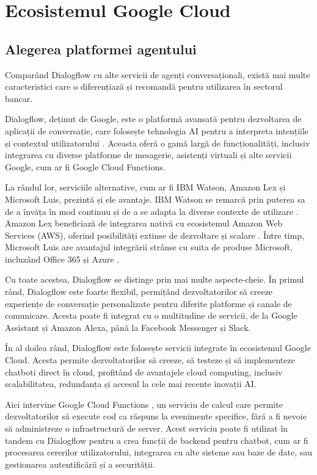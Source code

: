 \chapter{Ecosistemul Google Cloud}

\section{Alegerea platformei agentului}

Comparând Dialogflow cu alte servicii de agenți conversaționali, există mai multe caracteristici care o diferențiază și recomandă pentru utilizarea în sectorul bancar.

Dialogflow, deținut de Google, este o platformă avansată pentru dezvoltarea de aplicații de conversație, care folosește tehnologia AI pentru a interpreta intențiile și contextul utilizatorului \cite{google_dialogflow}. Aceasta oferă o gamă largă de funcționalități, inclusiv integrarea cu diverse platforme de mesagerie, asistenți virtuali și alte servicii Google, cum ar fi Google Cloud Functions.

La rândul lor, serviciile alternative, cum ar fi IBM Watson, Amazon Lex și Microsoft Luis, prezintă și ele avantaje. IBM Watson se remarcă prin puterea sa de a învăța în mod continuu și de a se adapta la diverse contexte de utilizare \cite{ibm_watson}. Amazon Lex beneficiază de integrarea nativă cu ecosistemul Amazon Web Services (AWS), oferind posibilități extinse de dezvoltare și scalare \cite{amazon_lex}. Între timp, Microsoft Luis are avantajul integrării strânse cu suita de produse Microsoft, incluzând Office 365 și Azure \cite{microsoft_luis}.

Cu toate acestea, Dialogflow se distinge prin mai multe aspecte-cheie. În primul rând, Dialogflow este foarte flexibil, permițând dezvoltatorilor să creeze experiențe de conversație personalizate pentru diferite platforme și canale de comunicare. Acesta poate fi integrat cu o multitudine de servicii, de la Google Assistant și Amazon Alexa, până la Facebook Messenger și Slack.

În al doilea rând, Dialogflow este folosește servicii integrate în ecosistemul Google Cloud. Acesta permite dezvoltatorilor să creeze, să testeze și să implementeze chatboti direct în cloud, profitând de avantajele cloud computing, inclusiv scalabilitatea, redundanța și accesul la cele mai recente inovații AI.

Aici intervine Google Cloud Functions \cite{google_cloud_functions}, un serviciu de calcul care permite dezvoltatorilor să execute cod ca răspuns la evenimente specifice, fără a fi nevoie să administreze o infrastructură de server. Acest serviciu poate fi utilizat în tandem cu Dialogflow pentru a crea funcții de backend pentru chatbot, cum ar fi procesarea cererilor utilizatorului, integrarea cu alte sisteme sau baze de date, sau gestionarea autentificării și a securității.

